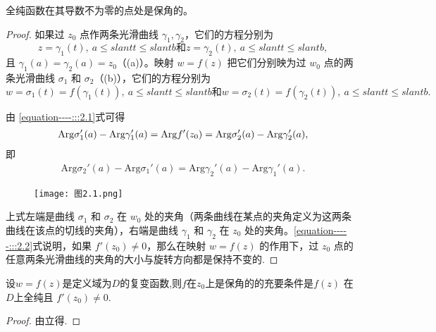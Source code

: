 \documentclass[../../main.tex]{subfiles}
\begin{document}
\begin{theorem}\label{theorem:全纯函数在其导数不为零的点处是保角的}
全纯函数在其导数不为零的点处是保角的。
\end{theorem}
\begin{proof}
如果过 \( z_0 \) 点作两条光滑曲线 \( \gamma_1, \gamma_2 \)，它们的方程分别为  
\[ z = \gamma_1(t),\ a \leqslant slant t \leqslant slant b \text{和}  
z = \gamma_2(t),\ a \leqslant slant t \leqslant slant b, \]  
且 \( \gamma_1(a) = \gamma_2(a) = z_0 \)（(a)）。映射 \( w = f(z) \) 把它们分别映为过 \( w_0 \) 点的两条光滑曲线 \( \sigma_1 \) 和 \( \sigma_2 \)（(b)），它们的方程分别为  
\[ w = \sigma_1(t) = f(\gamma_1(t)),\ a \leqslant slant t \leqslant slant b \text{和} w = \sigma_2(t) = f(\gamma_2(t)),\ a \leqslant slant t \leqslant slant b. \]  

由 \eqref{equation----:::2.1}式可得  
\begin{align}
\mathrm{Arg} \sigma_1'(a) - \mathrm{Arg} \gamma_1'(a) = \mathrm{Arg} f'(z_0) \notag = \mathrm{Arg} \sigma_2'(a) - \mathrm{Arg} \gamma_2'(a), \notag
\end{align}
即  
\begin{align}
\mathrm{Arg} \sigma_2'(a) - \mathrm{Arg} \sigma_1'(a) = \mathrm{Arg} \gamma_2'(a) - \mathrm{Arg} \gamma_1'(a). \label{equation-----:::2.2}
\end{align}
\begin{figure}[H]
\centering
\texttt{[image: 
图2.1.png]}
\caption{}
\label{figure:image-图2.1}
\end{figure}
上式左端是曲线 \( \sigma_1 \) 和 \( \sigma_2 \) 在 \( w_0 \) 处的夹角（两条曲线在某点的夹角定义为这两条曲线在该点的切线的夹角），右端是曲线 \( \gamma_1 \) 和 \( \gamma_2 \) 在 \( z_0 \) 处的夹角。\eqref{equation-----:::2.2}式说明，如果 \( f'(z_0) \neq 0 \)，那么在映射 \( w = f(z) \) 的作用下，过 \( z_0 \) 点的任意两条光滑曲线的夹角的大小与旋转方向都是保持不变的.
\end{proof}

\begin{corollary}
设\( w = f(z) \)是定义域为$D$的复变函数,则$f$在$z_0$上是保角的的充要条件是\( f(z) \) 在$D$上全纯且 \( f'(z_0) \neq 0 \).
\end{corollary}
\begin{proof}
由立得.
\end{proof}
\end{document}
